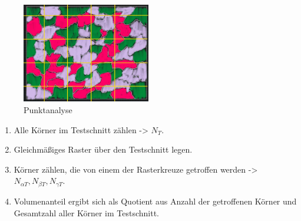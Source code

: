 \begin{figure}[h]
    \centering
    \includegraphics[width=0.5\textwidth]{entries/6/punkt.jpg}
    \caption{Punktanalyse}
    \label{fig:punkt}
\end{figure}
\begin{enumerate}
    \item Alle Körner im Testschnitt zählen -> \(N_T\).
    \item Gleichmäßiges Raster über den Testschnitt legen.
    \item Körner zählen, die von einem der Rasterkreuze getroffen werden -> \(N_{\alpha T}, N_{\beta T}, N_{\gamma T}\).
    \item Volumenanteil ergibt sich als Quotient aus Anzahl der getroffenen Körner und Gesamtzahl aller Körner im Testschnitt.
\end{enumerate}
